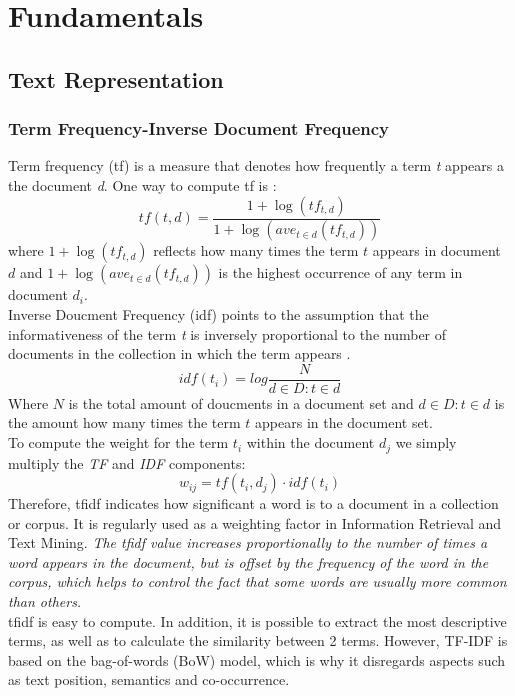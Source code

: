 \documentclass[a4paper, 11pt,titlepage,oneside,openany]{book}
\begin{document}
\chapter{Fundamentals}
\section{Text Representation}
\subsection{Term Frequency-Inverse Document Frequency}
Term frequency (\gls{tf}) is a measure that denotes how frequently a term \textit{t} appears a the document \textit{d}. One way to compute \gls{tf} is \cite{IR-book}:\\
\[
tf(t,d)=\frac{1+\log(tf_{t,d})}{1+\log(ave_{t\in d}(tf_{t,d}))}
\]
where $1+\log(tf_{t,d})$ reflects how many times the term $t$ appears in document $d$ and $1+\log(ave_{t\in d}(tf_{t,d}))$ is the highest occurrence of any term in document $d_i$.\\

\noindent Inverse Doucment Frequency (\gls{idf}) points to the assumption that the informativeness of the term \textit{t} is inversely proportional to the number of documents in the collection in which the term appears \cite{IR-book}.\\
\[
idf(t_i)=log\frac{N}{d \in D : t \in d}
\]
Where $N$ is the total amount of doucments in a document set and $d \in D : t \in d$ is the amount how many times the term $t$ appears in the document set.\\

\noindent To compute the weight for the term $t_i$ within the document $d_j$ we simply multiply the \textit{TF} and \textit{IDF} components:
\[
w_{ij}=tf(t_i, d_j)\cdot idf(t_i)
\]
Therefore, \Gls{tfidf} indicates how significant a word is to a document in a collection or corpus. It is regularly used as a weighting factor in Information Retrieval and Text Mining. 
\newpage
\noindent \textit{The \Gls{tfidf} value increases proportionally to the number of times a word appears in the document, but is offset by the frequency of the word in the corpus, which helps to control the fact that some words are usually more common than others.}\\
\noindent \Gls{tfidf} is easy to compute. In addition, it is possible to extract the most descriptive terms, as well as to calculate the similarity between 2 terms. However, TF-IDF is based on the bag-of-words (BoW) model, which is why it disregards aspects such as text position, semantics and co-occurrence.
\end{document}
